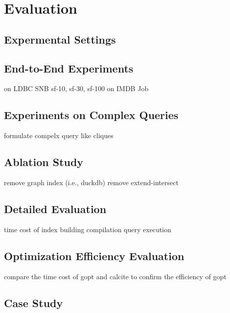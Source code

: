 \section{Evaluation}


\subsection{Expermental Settings}



\subsection{End-to-End Experiments}

on LDBC SNB sf-10, sf-30, sf-100
on IMDB Job

\subsection{Experiments on Complex Queries}

formulate compelx query like cliques


\subsection{Ablation Study}

remove graph index (i.e., duckdb)
remove extend-intersect


\subsection{Detailed Evaluation}

time cost of index building
compilation
query execution

\subsection{Optimization Efficiency Evaluation}

compare the time cost of gopt and calcite to confirm the efficiency of gopt


\subsection{Case Study}
